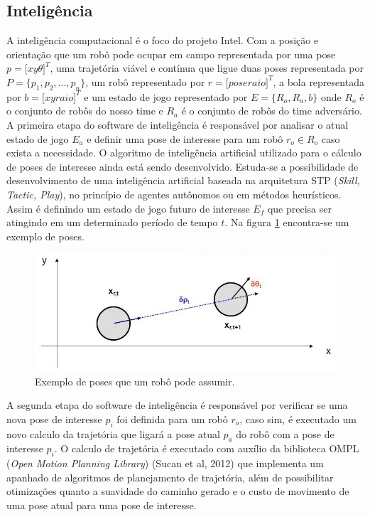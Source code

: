 \documentclass[conference]{IEEEtran}
\begin{document}
 \subsection{Inteligência}
A inteligência computacional é o foco do projeto Intel. Com a posição e orientação que um robô pode ocupar em campo representada por uma pose $p = [x$\hspace{0.25cm}$y$\hspace{0.25cm}$\theta]^T$, uma trajetória viável e contínua que ligue duas poses representada por $P = \{ p_1, p_2, ..., p_n \}$, um robô representado por $r = [pose$\hspace{0.25cm}$raio]^T$, a bola representada por $b = [x$\hspace{0.25cm}$y$\hspace{0.25cm}$raio]^T$ e um estado de jogo representado por $E = \{R_o, R_a, b\}$ onde $R_o$ é o conjunto de robôs do nosso time e $R_a$ é o conjunto de robôs do time adversário. A primeira etapa do software de inteligência é responsável por analisar o atual estado de jogo $E_a$ e definir uma pose de interesse para um robô $r_o \in R_o$ caso exista a necessidade. O algoritmo de inteligência artificial  utilizado para o cálculo de poses de interesse ainda está sendo desenvolvido. Estuda-se a possibilidade de desenvolvimento de uma inteligência artificial baseada na arquitetura STP (\textit{Skill, Tactic, Play})\cite{stp}, no princípio de agentes autônomos ou em métodos heurísticos. Assim é definindo um estado de jogo futuro de interesse $E_f$ que precisa ser atingindo em um determinado período de tempo $t$. Na figura \ref{img:pose} encontra-se um exemplo de poses.
\begin{figure}[thpb]
	\centering
	\includegraphics[width=\linewidth]{img/pose}
	\caption{Exemplo de poses que um robô pode assumir.}
	\label{img:pose}
\end{figure}

A segunda etapa do software de inteligência é responsável por verificar se uma nova pose de interesse $p_i$ foi definida para um robô $r_o$, caso sim, é executado um novo calculo da trajetória que ligará a pose atual $p_a$ do robô com a pose de interesse $p_i$. O calculo de trajetória é executado com auxílio da biblioteca OMPL (\textit{Open Motion Planning Library}) (Sucan et al, 2012)\cite{ompl} que implementa um apanhado de algoritmos de planejamento de trajetória, além de possibilitar otimizações quanto a suavidade do caminho gerado e o custo de movimento de uma pose atual para uma pose de interesse.
\end{document}
